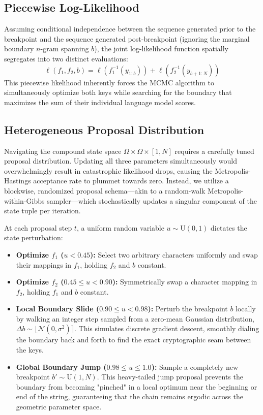 \documentclass[11pt]{article}
\begin{document}
\subsection{Piecewise Log-Likelihood}
Assuming conditional independence between the sequence generated prior to the breakpoint and the sequence generated post-breakpoint (ignoring the marginal boundary $n$-gram spanning $b$), the joint log-likelihood function spatially segregates into two distinct evaluations:
\begin{equation}
    \ell(f_1, f_2, b) = \ell\left(f_1^{-1}(y_{1:b})\right) + \ell\left(f_2^{-1}(y_{b+1:N})\right)
\end{equation}
This piecewise likelihood inherently forces the MCMC algorithm to simultaneously optimize both keys while searching for the boundary that maximizes the sum of their individual language model scores.

\subsection{Heterogeneous Proposal Distribution}
Navigating the compound state space $\Omega \times \Omega \times [1,N]$ requires a carefully tuned proposal distribution. Updating all three parameters simultaneously would overwhelmingly result in catastrophic likelihood drops, causing the Metropolis-Hastings acceptance rate to plummet towards zero. Instead, we utilize a blockwise, randomized proposal schema---akin to a random-walk Metropolis-within-Gibbs sampler---which stochastically updates a singular component of the state tuple per iteration. 

At each proposal step $t$, a uniform random variable $u \sim \text{U}(0,1)$ dictates the state perturbation:
\begin{itemize}[leftmargin=*]
    \item \textbf{Optimize $f_1$ ($u < 0.45$):} Select two arbitrary characters uniformly and swap their mappings in $f_1$, holding $f_2$ and $b$ constant.
    \item \textbf{Optimize $f_2$ ($0.45 \leq u < 0.90$):} Symmetrically swap a character mapping in $f_2$, holding $f_1$ and $b$ constant.
    \item \textbf{Local Boundary Slide ($0.90 \leq u < 0.98$):} Perturb the breakpoint $b$ locally by walking an integer step sampled from a zero-mean Gaussian distribution, $\Delta b \sim \lfloor \mathcal{N}(0, \sigma^2) \rceil$. This simulates discrete gradient descent, smoothly dialing the boundary back and forth to find the exact cryptographic seam between the keys.
    \item \textbf{Global Boundary Jump ($0.98 \leq u \leq 1.0$):} Sample a completely new breakpoint $b' \sim \text{U}(1, N)$. This heavy-tailed jump proposal prevents the boundary from becoming "pinched" in a local optimum near the beginning or end of the string, guaranteeing that the chain remains ergodic across the geometric parameter space.
\end{itemize}
\end{document}
